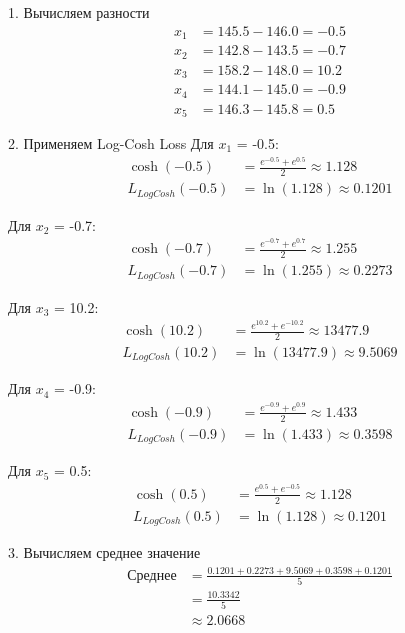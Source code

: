 1. Вычисляем разности
\[
    \begin{aligned}
        x_1 & = 145.5 - 146.0 = -0.5 \\
        x_2 & = 142.8 - 143.5 = -0.7 \\
        x_3 & = 158.2 - 148.0 = 10.2 \\
        x_4 & = 144.1 - 145.0 = -0.9 \\
        x_5 & = 146.3 - 145.8 = 0.5
    \end{aligned}
\]

2. Применяем Log-Cosh Loss
Для $x_1$ = -0.5:
\[
    \begin{aligned}
        \cosh(-0.5)       & = \frac{e^{-0.5} + e^{0.5}}{2} \approx 1.128 \\
        L_{LogCosh}(-0.5) & = \ln(1.128) \approx 0.1201
    \end{aligned}
\]

Для $x_2$ = -0.7:
\[
    \begin{aligned}
        \cosh(-0.7)       & = \frac{e^{-0.7} + e^{0.7}}{2} \approx 1.255 \\
        L_{LogCosh}(-0.7) & = \ln(1.255) \approx 0.2273
    \end{aligned}
\]

Для $x_3$ = 10.2:
\[
    \begin{aligned}
        \cosh(10.2)       & = \frac{e^{10.2} + e^{-10.2}}{2} \approx 13477.9 \\
        L_{LogCosh}(10.2) & = \ln(13477.9) \approx 9.5069
    \end{aligned}
\]

Для $x_4$ = -0.9:
\[
    \begin{aligned}
        \cosh(-0.9)       & = \frac{e^{-0.9} + e^{0.9}}{2} \approx 1.433 \\
        L_{LogCosh}(-0.9) & = \ln(1.433) \approx 0.3598
    \end{aligned}
\]

Для $x_5$ = 0.5:
\[
    \begin{aligned}
        \cosh(0.5)       & = \frac{e^{0.5} + e^{-0.5}}{2} \approx 1.128 \\
        L_{LogCosh}(0.5) & = \ln(1.128) \approx 0.1201
    \end{aligned}
\]

3. Вычисляем среднее значение
\[
    \begin{aligned}
        \text{Среднее} & = \frac{0.1201 + 0.2273 + 9.5069 + 0.3598 + 0.1201}{5} \\
                       & = \frac{10.3342}{5}                                    \\
                       & \approx 2.0668
    \end{aligned}
\]

